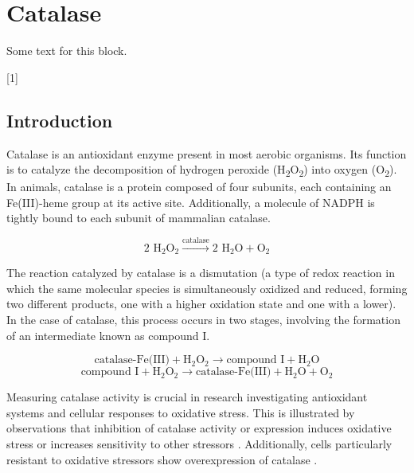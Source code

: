 \documentclass[
  9pt,
  american,
  a5paper,
  extrafontsizes,onecolumn,openright
  ]{memoir}
\newenvironment{Summary}
  {\begin{bclogo}[logo=\bctrombone, noborder=true, couleur=lightgray!50]{}\parindent0pt}
  {\end{bclogo}}
\newcommand{\toc}[1]{%
  \startcontents[chapters]%
  \printcontents[chapters]{}{1}[#1]{}%
  ~\newline%
}
\begin{document}
\chapter{Catalase}\label{catalase}

\begin{Summary}
Some text for this block.

\end{Summary}

\toc{1}

\newpage

\section{Introduction}\label{cat_intro}

Catalase is an antioxidant enzyme present in most aerobic organisms. Its function is to catalyze the decomposition of hydrogen peroxide (H\textsubscript{2}O\textsubscript{2}) into oxygen (O\textsubscript{2}). In animals, catalase is a protein composed of four subunits, each containing an Fe(III)-heme group at its active site. Additionally, a molecule of NADPH is tightly bound to each subunit of mammalian catalase.

\[
\text{2 H}_2\text{O}_2 \overset{\text{catalase}}{\rightarrow} \text{2 H}_2\text{O} + \text{O}_2
\]

The reaction catalyzed by catalase is a dismutation (a type of redox reaction in which the same molecular species is simultaneously oxidized and reduced, forming two different products, one with a higher oxidation state and one with a lower). In the case of catalase, this process occurs in two stages, involving the formation of an intermediate known as compound I.

\[
\text{catalase-Fe(III)} + \text{H}_2\text{O}_2 \rightarrow \text{compound I} + \text{H}_2\text{O}
\]
\[
\text{compound I} + \text{H}_2\text{O}_2 \rightarrow \text{catalase-Fe(III)} + \text{H}_2\text{O} + \text{O}_2
\]

Measuring catalase activity is crucial in research investigating antioxidant systems and cellular responses to oxidative stress. This is illustrated by observations that inhibition of catalase activity or expression induces oxidative stress \autocite{bagnyukova_catalase_2005} or increases sensitivity to other stressors \autocite{ho_mice_2004}. Additionally, cells particularly resistant to oxidative stressors show overexpression of catalase \autocite{spitz_mechanisms_1992}.
\end{document}
